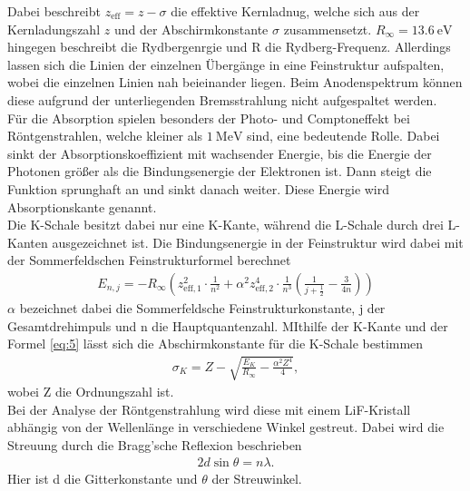Dabei beschreibt $z_{\text{eff}} =z-\sigma $ die effektive Kernladnug, welche sich aus der 
Kernladungszahl $z$ und der Abschirmkonstante $\sigma$ zusammensetzt. $R_{\infty}=\SI{13.6}{\electronvolt} $ hingegen
beschreibt die Rydbergenrgie und R die Rydberg-Frequenz.
Allerdings lassen sich die Linien der einzelnen Übergänge in eine Feinstruktur aufspalten, wobei die einzelnen
Linien nah beieinander liegen. Beim Anodenspektrum können diese aufgrund der unterliegenden Bremsstrahlung
nicht aufgespaltet werden.\\
Für die Absorption spielen besonders der Photo- und Comptoneffekt bei Röntgenstrahlen, welche kleiner
als $\SI{1}{\mega\electronvolt} $ sind, eine bedeutende Rolle. 
Dabei sinkt der Absorptionskoeffizient mit wachsender Energie, bis die Energie der Photonen
größer als die Bindungsenergie der Elektronen ist. Dann steigt die Funktion sprunghaft an und sinkt danach weiter.
Diese Energie wird Absorptionskante genannt.\\
Die K-Schale besitzt dabei nur eine K-Kante, während die L-Schale durch drei L-Kanten ausgezeichnet ist.
Die Bindungsenergie in der Feinstruktur wird dabei mit der Sommerfeldschen Feinstrukturformel berechnet \cite{V602}
\begin{align}
    E_{n,j}= - R_{\infty} \left(z_{\text{eff},1}^2\cdot \frac{1}{n^2}+\alpha ^2 z_{\text{eff},2}^4\cdot \frac{1}{n^3}\left(\frac{1}{j+\frac{1}{2}}-\frac{3}{4n} \right) \right) \label{eq:5}
\end{align}
$\alpha$ bezeichnet dabei die Sommerfeldsche Feinstrukturkonstante, j der Gesamtdrehimpuls und n 
die Hauptquantenzahl.
MIthilfe der K-Kante und der Formel \eqref{eq:5} lässt sich die Abschirmkonstante für die
K-Schale bestimmen \cite{V602}
\begin{align}
    \sigma _K = Z-\sqrt{\frac{E_K}{R_{\infty}}-\frac{\alpha^2Z^4}{4}} \label{eq:6},
\end{align}
wobei Z die Ordnungszahl ist.\\
Bei der Analyse der Röntgenstrahlung wird diese mit einem LiF-Kristall abhängig von der Wellenlänge in verschiedene
Winkel gestreut. Dabei wird die Streuung durch die Bragg'sche Reflexion beschrieben \cite{V602}
\begin{align}
    2d \sin \theta =n \lambda \label{eq:7}.
\end{align}
Hier ist d die Gitterkonstante und $\theta$ der Streuwinkel.


